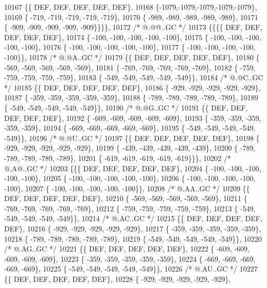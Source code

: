 \begin{DoxyCode}
10167 \{\{  DEF,  DEF,  DEF,  DEF,  DEF\},
10168 \{-1079,-1079,-1079,-1079,-1079\},
10169 \{ -719, -719, -719, -719, -719\},
10170 \{ -989, -989, -989, -989, -989\},
10171 \{ -909, -909, -909, -909, -909\}\}\}\},
10172 \textcolor{comment}{/*  @.@@..GC */}
10173 \{\{\{\{  DEF,  DEF,  DEF,  DEF,  DEF\},
10174 \{ -100, -100, -100, -100, -100\},
10175 \{ -100, -100, -100, -100, -100\},
10176 \{ -100, -100, -100, -100, -100\},
10177 \{ -100, -100, -100, -100, -100\}\},
10178 \textcolor{comment}{/*  @.@A..GC */}
10179 \{\{  DEF,  DEF,  DEF,  DEF,  DEF\},
10180 \{ -569, -569, -569, -569, -569\},
10181 \{ -769, -769, -769, -769, -769\},
10182 \{ -759, -759, -759, -759, -759\},
10183 \{ -549, -549, -549, -549, -549\}\},
10184 \textcolor{comment}{/*  @.@C..GC */}
10185 \{\{  DEF,  DEF,  DEF,  DEF,  DEF\},
10186 \{ -929, -929, -929, -929, -929\},
10187 \{ -359, -359, -359, -359, -359\},
10188 \{ -789, -789, -789, -789, -789\},
10189 \{ -549, -549, -549, -549, -549\}\},
10190 \textcolor{comment}{/*  @.@G..GC */}
10191 \{\{  DEF,  DEF,  DEF,  DEF,  DEF\},
10192 \{ -609, -609, -609, -609, -609\},
10193 \{ -359, -359, -359, -359, -359\},
10194 \{ -669, -669, -669, -669, -669\},
10195 \{ -549, -549, -549, -549, -549\}\},
10196 \textcolor{comment}{/*  @.@U..GC */}
10197 \{\{  DEF,  DEF,  DEF,  DEF,  DEF\},
10198 \{ -929, -929, -929, -929, -929\},
10199 \{ -439, -439, -439, -439, -439\},
10200 \{ -789, -789, -789, -789, -789\},
10201 \{ -619, -619, -619, -619, -619\}\}\},
10202 \textcolor{comment}{/*  @.A@..GC */}
10203 \{\{\{  DEF,  DEF,  DEF,  DEF,  DEF\},
10204 \{ -100, -100, -100, -100, -100\},
10205 \{ -100, -100, -100, -100, -100\},
10206 \{ -100, -100, -100, -100, -100\},
10207 \{ -100, -100, -100, -100, -100\}\},
10208 \textcolor{comment}{/*  @.AA..GC */}
10209 \{\{  DEF,  DEF,  DEF,  DEF,  DEF\},
10210 \{ -569, -569, -569, -569, -569\},
10211 \{ -769, -769, -769, -769, -769\},
10212 \{ -759, -759, -759, -759, -759\},
10213 \{ -549, -549, -549, -549, -549\}\},
10214 \textcolor{comment}{/*  @.AC..GC */}
10215 \{\{  DEF,  DEF,  DEF,  DEF,  DEF\},
10216 \{ -929, -929, -929, -929, -929\},
10217 \{ -359, -359, -359, -359, -359\},
10218 \{ -789, -789, -789, -789, -789\},
10219 \{ -549, -549, -549, -549, -549\}\},
10220 \textcolor{comment}{/*  @.AG..GC */}
10221 \{\{  DEF,  DEF,  DEF,  DEF,  DEF\},
10222 \{ -609, -609, -609, -609, -609\},
10223 \{ -359, -359, -359, -359, -359\},
10224 \{ -669, -669, -669, -669, -669\},
10225 \{ -549, -549, -549, -549, -549\}\},
10226 \textcolor{comment}{/*  @.AU..GC */}
10227 \{\{  DEF,  DEF,  DEF,  DEF,  DEF\},
10228 \{ -929, -929, -929, -929, -929\},

\end{DoxyCode}
